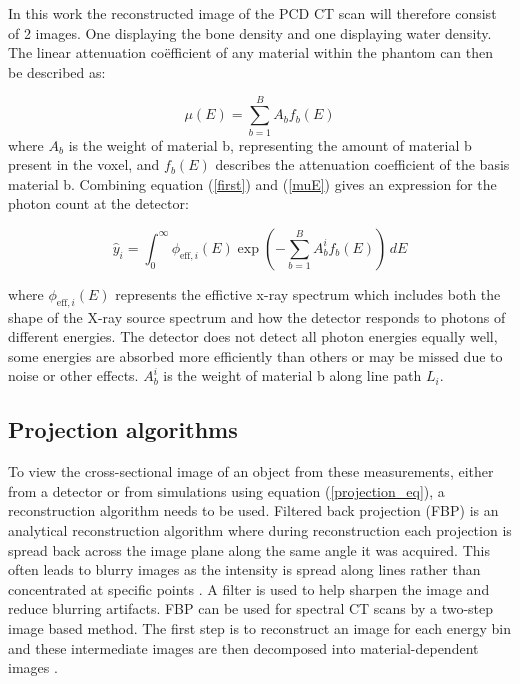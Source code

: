 \documentclass{article}
\begin{document}
In this work the reconstructed image of the PCD CT scan will therefore consist of 2 images. One displaying the bone density and one displaying water density. The linear attenuation coëfficient of any material within the phantom can then be described as:

\begin{equation}
\label{muE}
\mu(E) = \sum_{b=1}^{B} A_b f_b(E)
\end{equation}
where $A_b$ is the weight of material b, representing the amount of material b present in the voxel, and $f_b(E)$ describes the attenuation coefficient of the basis material b. Combining equation (\ref{first}) and (\ref{muE}) gives an expression for the photon count at the detector:

\begin{equation}
\hat{y}_i = \int_0^{\infty} \phi_{\text{eff},i}(E) \exp\left( - \sum_{b=1}^{B} A_b^i f_b(E) \right) \, dE
\end{equation}

where $\phi_{\text{eff},i}(E)$ represents the effictive x-ray spectrum which includes both the shape of the X-ray source spectrum and how the detector responds to photons of different energies. The detector does not detect all photon energies equally well, some energies are absorbed more efficiently than others or may be missed due to noise or other effects. $A_b^i$ is the weight of material b along line path $L_i$.

\subsection{Projection algorithms}

To view the cross-sectional image of an object from these measurements, either from a detector or from simulations using equation (\ref{projection_eq}), a reconstruction algorithm needs to be used. Filtered back projection (FBP) is an analytical reconstruction algorithm where during reconstruction each projection is spread back across the image plane along the same angle it was acquired. This often leads to blurry images as the intensity is spread along lines rather than concentrated at specific points \citep{zeng2001image}. A filter is used to help sharpen the image and reduce blurring artifacts. FBP can be used for spectral CT scans by a two-step image based method. The first step is to reconstruct an image for each energy bin and these intermediate images are then decomposed into material-dependent images \citep{mory2018comparison}.
\end{document}
